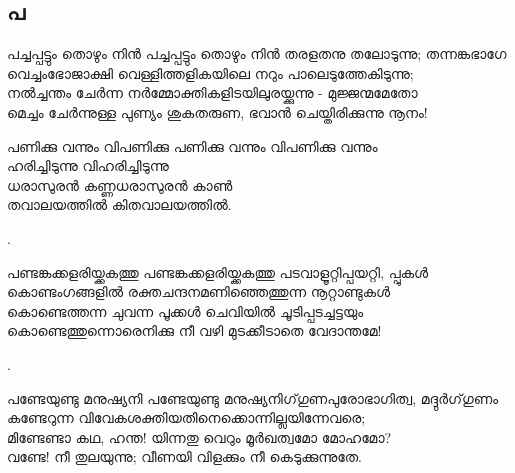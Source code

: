 \subsection{പ}
\begin{enumerate}


\begin{slokam}{\VSr}{\VNM}{പച്ചപ്പട്ടും തൊഴും നിൻ}
പച്ചപ്പട്ടും തൊഴും നിൻ തരളതനു തലോടുന്നു; തന്നങ്കഭാഗേ\\
വെച്ചംഭോജാക്ഷി വെള്ളിത്തളികയിലെ നറും പാലെടുത്തേകിടുന്നു;\\
നൽച്ചന്തം ചേർന്ന നർമ്മോക്തികളിടയിലുരയ്ക്കുന്നു - മുജ്ജന്മമേതോ\\
മെച്ചം ചേർന്നുള്ള പുണ്യം ശുകതരുണ, ഭവാൻ ചെയ്തിരിക്കുന്നു നൂനം!
\end{slokam}


\begin{slokam}{\VUv}{\AUK}{പണിക്കു വന്നും വിപണിക്കു}
പണിക്കു വന്നും വിപണിക്കു വന്നും\\
ഹരിച്ചിടുന്നു വിഹരിച്ചിടുന്നു\\
ധരാസുരൻ കണ്ണധരാസുരൻ കാൺ\\
തവാലയത്തിൽ കിതവാലയത്തിൽ.
\end{slokam}


.

\begin{slokam}{\VSv}{\VRV}{പണ്ടങ്കക്കളരിയ്ക്കകത്തു}
പണ്ടങ്കക്കളരിയ്ക്കകത്തു പടവാളൂറ്റിപ്പയറ്റി, പ്പുകൾ\\
കൊണ്ടംഗങ്ങളിൽ രക്തചന്ദനമണിഞ്ഞെത്തുന്ന നൂറ്റാണ്ടുകൾ\\
കൊണ്ടെത്തന്ന ചുവന്ന പൂക്കൾ ചെവിയിൽ ചൂടിപ്പടച്ചട്ടയും\\
കൊണ്ടെത്തുന്നൊരെനിക്കു നീ വഴി മുടക്കീടാതെ വേദാന്തമേ! 
\end{slokam}


.


\begin{slokam}{\VSv}{\KA}{പണ്ടേയുണ്ടു മനുഷ്യനി}
പണ്ടേയുണ്ടു മനുഷ്യനിഗ്‌ഗുണപുരോഭാഗിത്വ, മദ്ദുർഗ്‌ഗുണം\\
കണ്ടേറുന്ന വിവേകശക്തിയതിനെക്കൊന്നില്ലയിന്നേവരെ;\\
മിണ്ടേണ്ടാ കഥ, ഹന്ത! യിന്നതു വെറും മൂർഖത്വമോ മോഹമോ?\\
വണ്ടേ! നീ തുലയുന്നു; വീണയി വിളക്കും നീ കെടുക്കുന്നുതേ.
\end{slokam}



\end{enumerate}
